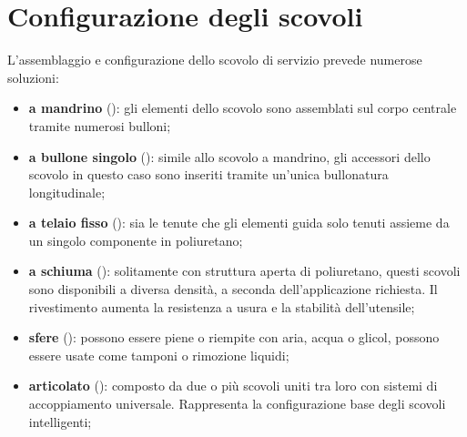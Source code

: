 \section{Configurazione degli scovoli}
L'assemblaggio e configurazione dello scovolo di servizio prevede numerose soluzioni:
\begin{itemize}
	\item \textbf{a mandrino} (): gli elementi dello scovolo sono assemblati sul corpo centrale tramite numerosi bulloni;
	\item \textbf{a bullone singolo} (): simile allo scovolo a mandrino, gli accessori dello scovolo in questo caso sono inseriti tramite un'unica bullonatura longitudinale;
	\item \textbf{a telaio fisso} (): sia le tenute che gli elementi guida solo tenuti assieme da un singolo componente in poliuretano;
	\item \textbf{a schiuma} (): solitamente con struttura aperta di poliuretano, questi scovoli sono disponibili a diversa densità, a seconda dell'applicazione richiesta. Il rivestimento aumenta la resistenza a usura e la stabilità dell'utensile;
	\item \textbf{sfere} (): possono essere piene o riempite con aria, acqua o glicol, possono essere usate come tamponi o rimozione liquidi;
	\item \textbf{articolato} (): composto da due o più scovoli uniti tra loro con sistemi di accoppiamento universale. Rappresenta la configurazione base degli scovoli intelligenti;

\end{itemize}

